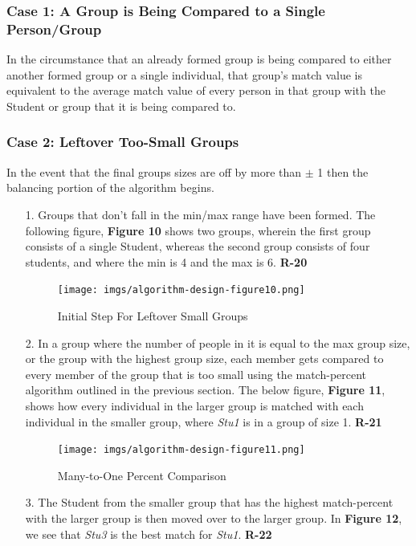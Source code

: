 \documentclass[12pt,letterpaper]{article}
\begin{document}
\subsubsection*{Case 1: A Group is Being Compared to a Single Person/Group}
In the circumstance that an already formed group is being compared to either another formed group or a single individual, that group's match value is equivalent to the average match value of every person in that group with the Student or group that it is being compared to. 
\subsubsection*{Case 2: Leftover Too-Small Groups}
In the event that the final groups sizes are off by more than $\pm$ 1 then the balancing portion of the algorithm begins.
\begin{enumerate}
	\item[1.] Groups that don't fall in the min/max range have been formed. The following figure, {\bf Figure 10} shows two groups, wherein the first group consists of a single Student, whereas the second group consists of four students, and where the min is 4 and the max is 6. {\bf R-20}
\begin{figure}[H]
	\caption{Initial Step For Leftover Small Groups}
	\begin{center}
		\texttt{[image: imgs/algorithm-design-figure10.png]}
	\end{center}
\end{figure}
	\item[2.] In a group where the number of people in it is equal to the max group size, or the group with the highest group size, each member gets compared to every member of the group that is too small using the match-percent algorithm outlined in the previous section. The below figure, {\bf Figure 11}, shows how every individual in the larger group is matched with each individual in the smaller group, where {\it Stu1} is in a group of size 1. {\bf R-21}
\begin{figure}[H]
	\caption{Many-to-One Percent Comparison}
	\begin{center}
		\texttt{[image: imgs/algorithm-design-figure11.png]}
	\end{center}
\end{figure}
	\item[3.] The Student from the smaller group that has the highest match-percent with the larger group is then moved over to the larger group. In {\bf Figure 12}, we see that {\it Stu3} is the best match for {\it Stu1}. {\bf R-22}

\end{enumerate}
\end{document}
